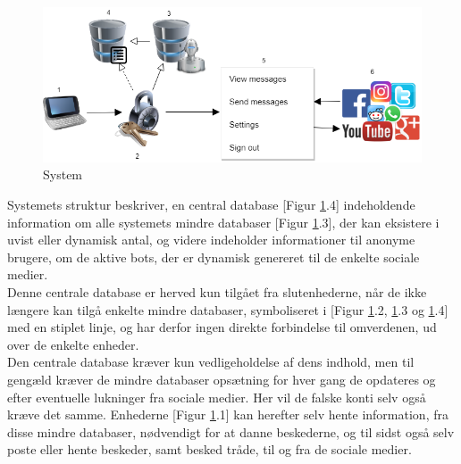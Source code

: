 \begin{figure}[H]
    \centering
    \includegraphics[width=0.70\linewidth]{Projectdoc/Assets/Illustrationer/System_struckure.png}
    \caption{System}
    \label{fig:sysdiagram}
\end{figure}

Systemets struktur beskriver, en central database [Figur \ref{fig:sysdiagram}.4] indeholdende information om alle systemets mindre databaser [Figur \ref{fig:sysdiagram}.3], der kan eksistere i uvist eller dynamisk antal, og videre indeholder informationer til anonyme brugere, om de aktive bots, der er dynamisk genereret til de enkelte sociale medier.\\
Denne centrale database er herved kun tilgået fra slutenhederne, når de ikke længere kan tilgå enkelte mindre databaser, symboliseret i [Figur \ref{fig:sysdiagram}.2, \ref{fig:sysdiagram}.3 og \ref{fig:sysdiagram}.4] med en stiplet linje, og har derfor ingen direkte forbindelse til omverdenen, ud over de enkelte enheder.\\
Den centrale database kræver kun vedligeholdelse af dens indhold, men til gengæld kræver de mindre databaser opsætning for hver gang de opdateres og efter eventuelle lukninger fra sociale medier. Her vil de falske konti selv også kræve det samme.
Enhederne [Figur \ref{fig:sysdiagram}.1] kan herefter selv hente information, fra disse mindre databaser, nødvendigt for at danne beskederne, og til sidst også selv poste eller hente beskeder, samt besked tråde, til og fra de sociale medier.